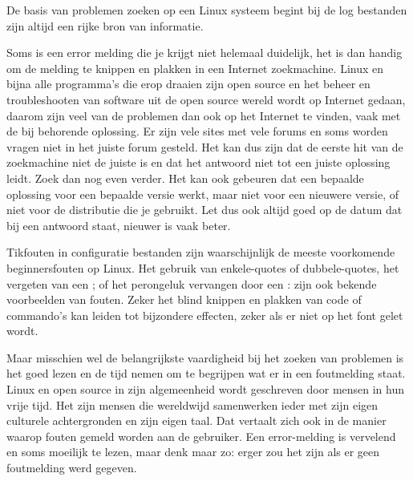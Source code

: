 De basis van problemen zoeken op een Linux systeem begint bij de log bestanden zijn altijd een rijke bron van informatie.

Soms is een error melding die je krijgt niet helemaal duidelijk, het is dan handig om de melding te knippen en plakken in een Internet zoekmachine. Linux en bijna alle programma's die erop draaien zijn open source en het beheer en troubleshooten van software uit de open source wereld wordt op Internet gedaan, daarom zijn veel van de problemen dan ook op het Internet te vinden, vaak met de bij behorende oplossing. Er zijn vele sites met vele forums en soms worden vragen niet in het juiste forum gesteld. Het kan dus zijn dat de eerste hit van de zoekmachine niet de juiste is en dat het antwoord niet tot een juiste oplossing leidt. Zoek dan nog even verder. Het kan ook gebeuren dat een bepaalde oplossing voor een bepaalde versie werkt, maar niet voor een nieuwere versie, of niet voor de distributie die je gebruikt. Let dus ook altijd goed op de datum dat bij een antwoord staat, nieuwer is vaak beter.

Tikfouten in configuratie bestanden zijn waarschijnlijk de meeste voorkomende beginnersfouten op Linux. Het gebruik van enkele-quotes of dubbele-quotes, het vergeten van een ; of het perongeluk vervangen door een : zijn ook bekende voorbeelden van fouten. Zeker het blind knippen en plakken van code of commando's kan leiden tot bijzondere effecten, zeker als er niet op het font gelet wordt.

Maar misschien wel de belangrijkste vaardigheid bij het zoeken van problemen is het goed lezen en de tijd nemen om te begrijpen wat er in een foutmelding staat. Linux en open source in zijn algemeenheid wordt geschreven door mensen in hun vrije tijd. Het zijn mensen die wereldwijd samenwerken ieder met zijn eigen culturele achtergronden en zijn eigen taal. Dat vertaalt zich ook in de manier waarop fouten gemeld worden aan de gebruiker. Een error-melding is vervelend en soms moeilijk te lezen, maar denk maar zo: erger zou het zijn als er geen foutmelding werd gegeven.

